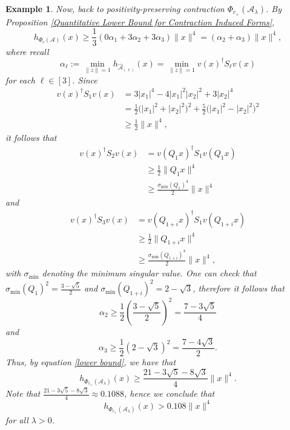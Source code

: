 \documentclass[11pt]{article}
\newtheorem{example}[theorem]{Example}
\begin{document}
\begin{example}
    Now, back to positivity-preserving contraction $\Phi_{c_+}(\mathcal{A}_{\lambda})$. By Proposition \ref{Quantitative Lower Bound for Contraction Induced Forms}, 
    \begin{equation}\label{lower bound}
        h_{\Phi_c(\mathcal{A})}(x) \geq \frac{1}{3}(0\alpha_1+3\alpha_2+3\alpha_3)\|x\|^4 = (\alpha_2+\alpha_3)\|x\|^4,
    \end{equation}
    where recall \[\alpha_{\ell} := \min\limits_{\|z\|=1}h_{\widehat{\mathcal{A}}_{(\ell)}}(x) = \min\limits_{\|z\|=1}v(x)^{\dagger}S_{\ell}v(x)\]
    for each $\ell\in [3]$. Since
    \begin{align*}
        v(x)^{\dagger}S_1v(x) &= 3|x_1|^4-4|x_1|^2|x_2|^2+3|x_2|^4 \\
        &= \frac{1}{2}\big(|x_1|^2+|x_2|^2\big)^2+\frac{5}{2}\big(|x_1|^2-|x_2|^2\big)^2 \\
        &\geq \frac{1}{2}\|x\|^4,
    \end{align*}
    it follows that 
    \begin{align*}
        v(x)^{\dagger}S_2v(x) &= v(Q_1x)^{\dagger}S_1v(Q_1x) \\
        &\geq \frac{1}{2}\|Q_1x\|^4 \\
        &\geq \frac{\sigma_{\min}(Q_1)^4}{2}\|x\|^4
    \end{align*}
    and 
    \begin{align*}
        v(x)^{\dagger}S_3v(x) &= v(Q_{1+i}x)^{\dagger}S_1v(Q_{1+i}x) \\
        &\geq \frac{1}{2}\|Q_{1+i}x\|^4 \\
        &\geq \frac{\sigma_{\min}(Q_{1+i})^4}{2}\|x\|^4,
    \end{align*}
    with $\sigma_{\min}$ denoting the minimum singular value.
    One can check that $\sigma_{\min}(Q_1)^2 = \frac{3-\sqrt{5}}{2}$ and $\sigma_{\min}(Q_{1+i})^2 = 2-\sqrt{3}$, therefore it follows that 
    \[\alpha_2 \geq \frac{1}{2}\left(\frac{3-\sqrt{5}}{2}\right)^2 = \frac{7-3\sqrt{5}}{4}\]
    and 
    \[\alpha_3 \geq \frac{1}{2}(2-\sqrt{3})^2 = \frac{7-4\sqrt{3}}{2}.\]
    Thus, by equation \eqref{lower bound}, we have that 
    \[h_{\Phi_{c_+}(\mathcal{A}_{\lambda})}(x) \geq \frac{21-3\sqrt{5}-8\sqrt{3}}{4}\|x\|^4.\]
    Note that $\frac{21-3\sqrt{5}-8\sqrt{3}}{4}\approx 0.1088$, hence we conclude that 
    \[h_{\Phi_{c_+}(\mathcal{A}_{\lambda})}(x) > 0.108\|x\|^4\]
    for all $\lambda > 0$. 
\end{example}
\end{document}
